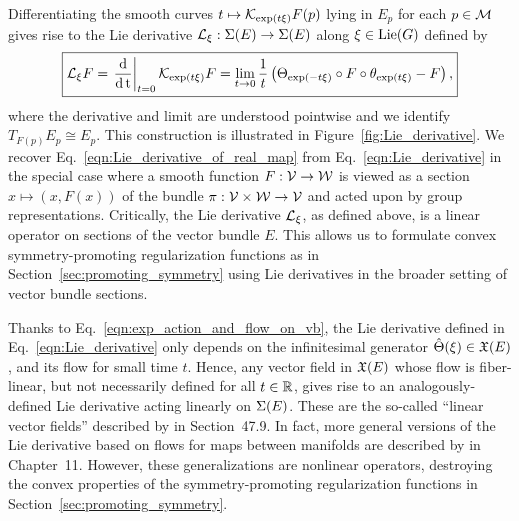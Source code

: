 \documentclass[twoside,11pt]{article}
\begin{document}
Differentiating the smooth curves $t \mapsto {\mathcal{K}}_{\exp(t\xi)} F (p)$ lying in $E_p$ for each $p\in{\mathcal{M}}$ gives rise to the Lie derivative ${\mathcal{L}}_{\xi}:\operatorname{\Sigma}(E) \to \operatorname{\Sigma}(E)$ along $\xi \in \operatorname{Lie}(G)$ defined by
\begin{equation}
    \boxed{
    {\mathcal{L}}_{\xi} F 
    = \left.\operatorname{\frac{\operatorname{\mathrm{d}}}{\operatorname{\mathrm{d}} t}} \right\vert_{t=0} {\mathcal{K}}_{\exp(t\xi)} F 
    = \lim_{t\to 0} \frac{1}{t}\left( \Theta_{\exp(-t\xi)}\circ F \circ \theta_{\exp(t\xi)} - F \right),
    }
    \label{eqn:Lie_derivative}
\end{equation}
where the derivative and limit 
are understood pointwise and we identify $T_{F(p)} E_p \cong E_p$.
This construction is illustrated in Figure~\ref{fig:Lie_derivative}.
We recover Eq.~\ref{eqn:Lie_derivative_of_real_map} from Eq.~\ref{eqn:Lie_derivative} in the special case where a smooth function $F:{\mathcal{V}} \to {\mathcal{W}}$ is viewed as a section $x \mapsto (x,F(x))$ of the bundle $\pi:{\mathcal{V}}\times{\mathcal{W}} \to {\mathcal{V}}$ and acted upon by group representations.
Critically, the Lie derivative ${\mathcal{L}}_{\xi}$, as defined above, is a linear operator on sections of the vector bundle $E$.
This allows us to formulate convex symmetry-promoting regularization functions as in Section~\ref{sec:promoting_symmetry} using Lie derivatives in the broader setting of vector bundle sections.

\begin{remark}
    Thanks to Eq.~\ref{eqn:exp_action_and_flow_on_vb}, the Lie derivative defined in Eq.~\ref{eqn:Lie_derivative} only depends on the infinitesimal generator $\hat{\Theta}(\xi) \in \mathfrak{X}(E)$, and its flow for small time $t$.
    Hence, any vector field in $\mathfrak{X}(E)$ whose flow is fiber-linear, but not necessarily defined for all $t\in\mathbb{R}$, gives rise to an analogously-defined Lie derivative acting linearly on $\operatorname{\Sigma}(E)$.
    These are the so-called ``linear vector fields'' described by \cite{Kolar1993natural} in Section~47.9.
    In fact, more general versions of the Lie derivative based on flows for maps between manifolds are described by \cite{Kolar1993natural} in Chapter~11.
    However, these generalizations are nonlinear operators, destroying the convex properties of the symmetry-promoting regularization functions in Section~\ref{sec:promoting_symmetry}.
\end{remark}
\end{document}
